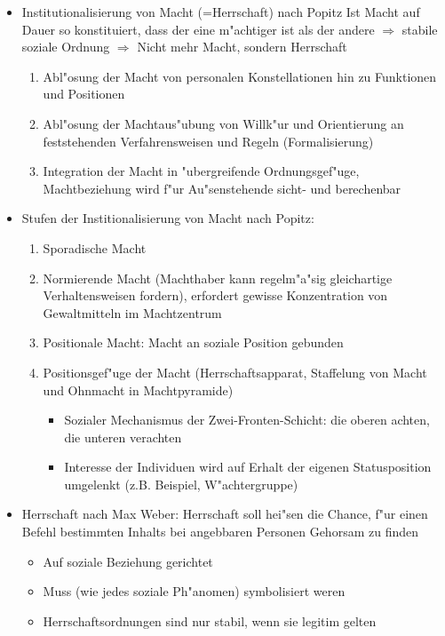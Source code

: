\begin{itemize}
	\item Institutionalisierung von Macht (=Herrschaft) nach Popitz
		Ist Macht auf Dauer so konstituiert, dass der eine m"achtiger ist als der andere $\Rightarrow$ stabile soziale Ordnung $\Rightarrow$ Nicht mehr Macht, sondern Herrschaft
		\begin{enumerate}
			\item
				Abl"osung der Macht von personalen Konstellationen hin zu Funktionen und Positionen
			\item
				Abl"osung der Machtaus"ubung von Willk"ur und Orientierung an feststehenden Verfahrensweisen und Regeln (Formalisierung)
			\item
				Integration der Macht in "ubergreifende Ordnungsgef"uge, Machtbeziehung wird f"ur Au"senstehende sicht- und berechenbar
		\end{enumerate}

	\item
		Stufen der Institionalisierung von Macht nach Popitz:
		\begin{enumerate}
			\item
				Sporadische Macht
			\item
				Normierende Macht (Machthaber kann regelm"a"sig gleichartige Verhaltensweisen fordern), erfordert gewisse Konzentration von Gewaltmitteln im Machtzentrum
			\item
				Positionale Macht: Macht an soziale Position gebunden
			\item
				Positionsgef"uge der Macht (Herrschaftsapparat, Staffelung von Macht und Ohnmacht in Machtpyramide)
				\begin{itemize}
					\item
						Sozialer Mechanismus der Zwei-Fronten-Schicht: die oberen achten, die unteren verachten
					\item
						Interesse der Individuen wird auf Erhalt der eigenen Statusposition umgelenkt (z.B. Beispiel, W"achtergruppe)
				\end{itemize}
		\end{enumerate}
	\item
		Herrschaft nach Max Weber: Herrschaft soll hei"sen die Chance, f"ur einen Befehl bestimmten Inhalts bei angebbaren Personen Gehorsam zu finden
		\begin{itemize}
			\item
				Auf soziale Beziehung gerichtet
			\item
				Muss (wie jedes soziale Ph"anomen) symbolisiert weren
			\item
				Herrschaftsordnungen sind nur stabil, wenn sie legitim gelten
		\end{itemize}


\end{itemize}
